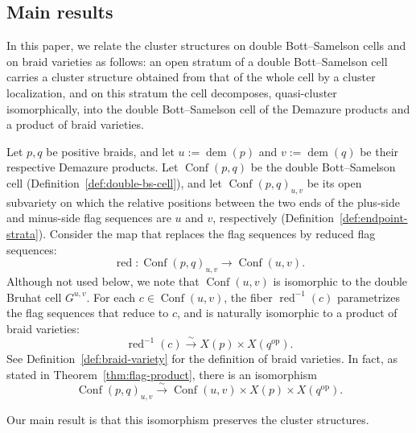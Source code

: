\documentclass[10pt,a4paper]{article}
\theoremstyle{definition}
\theoremstyle{remark}
\newcommand{\Conf}{\operatorname{Conf}}
\newcommand{\Split}{\operatorname{split}}
\begin{document}
\subsection{Main results}

In this paper, we relate the cluster structures on double Bott--Samelson cells
and on braid varieties as follows: an open stratum of a double Bott--Samelson
cell carries a cluster structure obtained from that of the whole cell by a
cluster localization, and on this stratum the cell decomposes, quasi-cluster
isomorphically, into the double Bott--Samelson cell of the Demazure products
and a product of braid varieties.

Let \(p,q\) be positive braids, and let \(u:=\operatorname{dem}(p)\) and
\(v:=\operatorname{dem}(q)\) be their respective Demazure products.  Let
\(\Conf(p,q)\) be the double Bott--Samelson cell
(Definition~\ref{def:double-bs-cell}), and let \(\Conf(p,q)_{u,v}\) be its open
subvariety on which the relative positions between the two ends of the plus-side
and minus-side flag sequences are \(u\) and \(v\), respectively
(Definition~\ref{def:endpoint-strata}).  Consider the map that replaces the
flag sequences by reduced flag sequences:
\[
 \operatorname{red}:
 \Conf(p,q)_{u,v}
 \longrightarrow \Conf(u,v).
\]
Although not used below, we note that \(\Conf(u,v)\) is isomorphic to the double Bruhat cell
\(G^{u,v}\).  For each
\(c\in\Conf(u,v)\), the fiber \(\operatorname{red}^{-1}(c)\) parametrizes the
flag sequences that reduce to \(c\), and is naturally isomorphic to a product
of braid varieties:
\[
 \operatorname{red}^{-1}(c)
 \xrightarrow{\sim}
 X(p)\times X(q^{\mathrm{op}}).
\]
See Definition~\ref{def:braid-variety} for the definition of braid varieties.
In fact, as stated in Theorem~\ref{thm:flag-product}, there is an isomorphism
\begin{equation}
 \Conf(p,q)_{u,v}
 \xrightarrow{\sim}
 \Conf(u,v)\times X(p)\times X(q^{\mathrm{op}}).
 \tag{\(\ast\)}
 \label{eq:intro-split}
\end{equation}

Our main result is that this isomorphism preserves the cluster structures.
\end{document}
